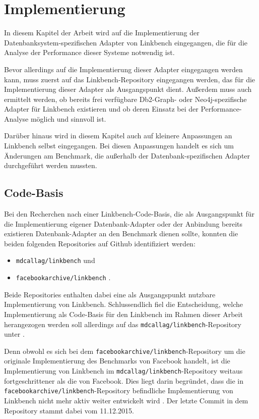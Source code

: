 \chapter{Implementierung}
\label{implementierung}
In diesem Kapitel der Arbeit wird auf die Implementierung der Datenbanksystem-spezifischen Adapter von Linkbench eingegangen, die für die Analyse der Performance dieser Systeme notwendig ist. 

Bevor allerdings auf die Implementierung dieser Adapter eingegangen werden kann, muss zuerst auf das Linkbench-Repository eingegangen werden, das für die Implementierung dieser Adapter als Ausgangspunkt dient. Außerdem muss auch ermittelt werden, ob bereits frei verfügbare Db2-Graph- oder Neo4j-spezifische Adapter für Linkbench existieren und ob deren Einsatz bei der Performance-Analyse möglich und sinnvoll ist.

Darüber hinaus wird in diesem Kapitel auch auf kleinere Anpassungen an Linkbench selbst eingegangen. Bei diesen Anpassungen handelt es sich um Änderungen am Benchmark, die außerhalb der Datenbank-spezifischen Adapter durchgeführt werden mussten.

\section{Code-Basis}
\label{implementierung:basis}
Bei den Recherchen nach einer Linkbench-Code-Basis, die als Ausgangspunkt für die Implementierung eigener Datenbank-Adapter oder der Anbindung bereits existieren Datenbank-Adapter an den Benchmark dienen sollte, konnten die beiden folgenden Repositories auf Github identifiziert werden:
\begin{itemize}
    \item \texttt{mdcallag/linkbench} \cite{mc_linkbench_github} und 
    \item \texttt{facebookarchive/linkbench} \cite{fb_linkbench_github}.
\end{itemize}
Beide Repositories enthalten dabei eine als Ausgangspunkt nutzbare Implementierung von Linkbench. Schlussendlich fiel die Entscheidung, welche Implementierung als Code-Basis für den Linkbench im Rahmen dieser Arbeit herangezogen werden soll allerdings auf das \texttt{mdcallag/linkbench}-Repository unter \cite{mc_linkbench_github}. 

Denn obwohl es sich bei dem \texttt{facebookarchive/linkbench}-Repository um die originale Implementierung des Benchmarks von Facebook handelt, ist die Implementierung von Linkbench im \texttt{mdcallag/linkbench}-Repository weitaus fortgeschrittener als die von Facebook. Dies liegt darin begründet, dass die in \texttt{facebookarchive\allowbreak /linkbench}-Repository befindliche Implementierung von Linkbench nicht mehr aktiv weiter entwickelt wird \cite{fb_linkbench_github}. Der letzte Commit in dem Repository stammt dabei vom 11.12.2015. 

